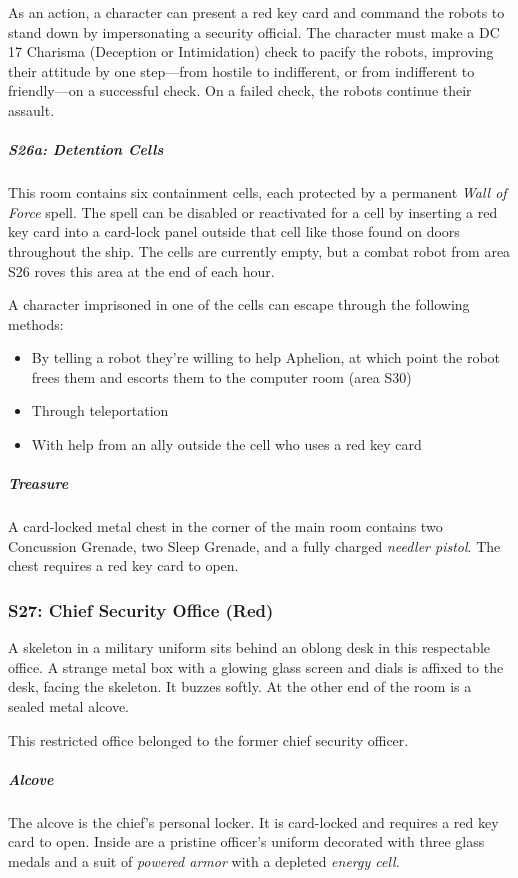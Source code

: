 \documentclass[10pt,a4paper,twoside,bg=print,twocolumn,openany,nodeprecatedcode]{dndbook}
\begin{document}
As an action, a character can present a red key card and command the robots to stand down by impersonating a security official. The character must make a DC 17 Charisma (Deception or Intimidation) check to pacify the robots, improving their attitude by one step—from hostile to indifferent, or from indifferent to friendly—on a successful check. On a failed check, the robots continue their assault.

\subparagraph{S26a: Detention Cells}
This room contains six containment cells, each protected by a permanent \textit{Wall of Force} spell. The spell can be disabled or reactivated for a cell by inserting a red key card into a card-lock panel outside that cell like those found on doors throughout the ship. The cells are currently empty, but a combat robot from area S26 roves this area at the end of each hour.

A character imprisoned in one of the cells can escape through the following methods:


\begin{itemize}
\item By telling a robot they're willing to help Aphelion, at which point the robot frees them and escorts them to the computer room (area S30)
\item Through teleportation
\item With help from an ally outside the cell who uses a red key card
\end{itemize}

\subparagraph{Treasure}
A card-locked metal chest in the corner of the main room contains two Concussion Grenade, two Sleep Grenade, and a fully charged \textit{needler pistol}. The chest requires a red key card to open.

\subsubsection{S27: Chief Security Office (Red)}
\begin{DndReadAloud}{}
A skeleton in a military uniform sits behind an oblong desk in this respectable office. A strange metal box with a glowing glass screen and dials is affixed to the desk, facing the skeleton. It buzzes softly. At the other end of the room is a sealed metal alcove.

\end{DndReadAloud}

This restricted office belonged to the former chief security officer.

\subparagraph{Alcove}
The alcove is the chief's personal locker. It is card-locked and requires a red key card to open. Inside are a pristine officer's uniform decorated with three glass medals and a suit of \textit{powered armor} with a depleted \textit{energy cell}.
\end{document}
